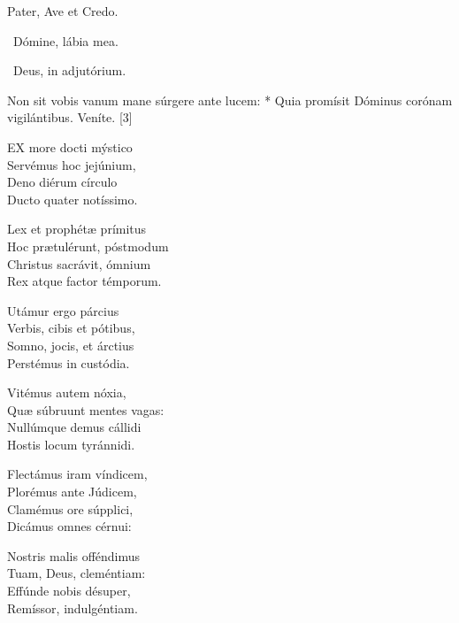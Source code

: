 




Pater, Ave et Credo.

\V\ Dómine, lábia mea.

\V\ Deus, in adjutórium.


 Non sit vobis vanum mane súrgere ante lucem: * Quia promísit Dóminus corónam vigilántibus.  Veníte. [3]


\lettrine[lines=2]{E}{X} more docti mýstico\\
Servémus hoc jejúnium,\\
Deno diérum círculo\\
Ducto quater notíssimo.

Lex et prophétæ prímitus\\
Hoc prætulérunt, póstmodum\\
Christus sacrávit, ómnium\\
Rex atque factor témporum.

Utámur ergo párcius\\
Verbis, cibis et pótibus,\\
Somno, jocis, et árctius\\
Perstémus in custódia.

Vitémus autem nóxia,\\
Quæ súbruunt mentes vagas:\\
Nullúmque demus cállidi\\
Hostis locum tyránnidi.

Flectámus iram víndicem,\\
Plorémus ante Júdicem,\\
Clamémus ore súpplici,\\
Dicámus omnes cérnui:

Nostris malis offéndimus\\
Tuam, Deus, cleméntiam:\\
Effúnde nobis désuper,\\
Remíssor, indulgéntiam.

